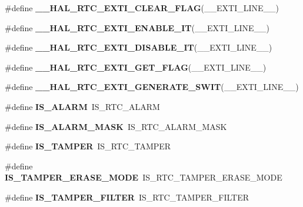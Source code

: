 \begin{DoxyCompactItemize}
\item 
\#define {\bfseries \+\_\+\+\_\+\+H\+A\+L\+\_\+\+R\+T\+C\+\_\+\+E\+X\+T\+I\+\_\+\+C\+L\+E\+A\+R\+\_\+\+F\+L\+AG}(\+\_\+\+\_\+\+E\+X\+T\+I\+\_\+\+L\+I\+N\+E\+\_\+\+\_\+)
\item 
\#define {\bfseries \+\_\+\+\_\+\+H\+A\+L\+\_\+\+R\+T\+C\+\_\+\+E\+X\+T\+I\+\_\+\+E\+N\+A\+B\+L\+E\+\_\+\+IT}(\+\_\+\+\_\+\+E\+X\+T\+I\+\_\+\+L\+I\+N\+E\+\_\+\+\_\+)
\item 
\#define {\bfseries \+\_\+\+\_\+\+H\+A\+L\+\_\+\+R\+T\+C\+\_\+\+E\+X\+T\+I\+\_\+\+D\+I\+S\+A\+B\+L\+E\+\_\+\+IT}(\+\_\+\+\_\+\+E\+X\+T\+I\+\_\+\+L\+I\+N\+E\+\_\+\+\_\+)
\item 
\#define {\bfseries \+\_\+\+\_\+\+H\+A\+L\+\_\+\+R\+T\+C\+\_\+\+E\+X\+T\+I\+\_\+\+G\+E\+T\+\_\+\+F\+L\+AG}(\+\_\+\+\_\+\+E\+X\+T\+I\+\_\+\+L\+I\+N\+E\+\_\+\+\_\+)
\item 
\#define {\bfseries \+\_\+\+\_\+\+H\+A\+L\+\_\+\+R\+T\+C\+\_\+\+E\+X\+T\+I\+\_\+\+G\+E\+N\+E\+R\+A\+T\+E\+\_\+\+S\+W\+IT}(\+\_\+\+\_\+\+E\+X\+T\+I\+\_\+\+L\+I\+N\+E\+\_\+\+\_\+)
\item 
\#define {\bfseries I\+S\+\_\+\+A\+L\+A\+RM}~I\+S\+\_\+\+R\+T\+C\+\_\+\+A\+L\+A\+RM\hypertarget{group___h_a_l___r_t_c___aliased___macros_ga7e6a2b69bd0cb85a1d44801ccb116e38}{}\label{group___h_a_l___r_t_c___aliased___macros_ga7e6a2b69bd0cb85a1d44801ccb116e38}

\item 
\#define {\bfseries I\+S\+\_\+\+A\+L\+A\+R\+M\+\_\+\+M\+A\+SK}~I\+S\+\_\+\+R\+T\+C\+\_\+\+A\+L\+A\+R\+M\+\_\+\+M\+A\+SK\hypertarget{group___h_a_l___r_t_c___aliased___macros_ga927c5de67a80c6ea175db864959df3e0}{}\label{group___h_a_l___r_t_c___aliased___macros_ga927c5de67a80c6ea175db864959df3e0}

\item 
\#define {\bfseries I\+S\+\_\+\+T\+A\+M\+P\+ER}~I\+S\+\_\+\+R\+T\+C\+\_\+\+T\+A\+M\+P\+ER\hypertarget{group___h_a_l___r_t_c___aliased___macros_ga720879737ff77db80e800545672cdb72}{}\label{group___h_a_l___r_t_c___aliased___macros_ga720879737ff77db80e800545672cdb72}

\item 
\#define {\bfseries I\+S\+\_\+\+T\+A\+M\+P\+E\+R\+\_\+\+E\+R\+A\+S\+E\+\_\+\+M\+O\+DE}~I\+S\+\_\+\+R\+T\+C\+\_\+\+T\+A\+M\+P\+E\+R\+\_\+\+E\+R\+A\+S\+E\+\_\+\+M\+O\+DE\hypertarget{group___h_a_l___r_t_c___aliased___macros_ga49cab06ba96add6f8dddac75414b468f}{}\label{group___h_a_l___r_t_c___aliased___macros_ga49cab06ba96add6f8dddac75414b468f}

\item 
\#define {\bfseries I\+S\+\_\+\+T\+A\+M\+P\+E\+R\+\_\+\+F\+I\+L\+T\+ER}~I\+S\+\_\+\+R\+T\+C\+\_\+\+T\+A\+M\+P\+E\+R\+\_\+\+F\+I\+L\+T\+ER\hypertarget{group___h_a_l___r_t_c___aliased___macros_ga96d532a9a8a0b283f2fd289355001233}{}\label{group___h_a_l___r_t_c___aliased___macros_ga96d532a9a8a0b283f2fd289355001233}


\end{DoxyCompactItemize}
